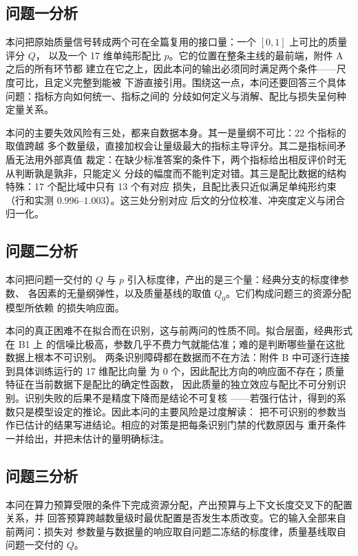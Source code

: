 \documentclass[bwprint]{gmcmthesis}
\numberwithin{equation}{section}
\numberwithin{figure}{section}
\numberwithin{table}{section}
\begin{document}

\subsection{问题一分析}

本问把原始质量信号转成两个可在全篇复用的接口量：一个 $[0,1]$ 上可比的质量评分 $Q$，
以及一个 17 维单纯形配比 $p$。它的位置在整条主线的最前端，附件 A 之后的所有环节都
建立在它之上，因此本问的输出必须同时满足两个条件——尺度可比，且定义完整到能被
下游直接引用。围绕这一点，本问还要回答三个具体问题：指标方向如何统一、指标之间的
分歧如何定义与消解、配比与损失呈何种定量关系。

本问的主要失效风险有三处，都来自数据本身。其一是量纲不可比：22 个指标的取值跨越
多个数量级，直接加权会让量级最大的指标主导评分。其二是指标间矛盾无法用外部真值
裁定：在缺少标准答案的条件下，两个指标给出相反评价时无从判断孰是孰非，只能定义
分歧的幅度而不能判定对错。其三是配比数据的结构特殊：17 个配比域中只有 13 个有对应
损失，且配比表只近似满足单纯形约束（行和实测 $0.996$--$1.003$）。这三处分别对应
后文的分位校准、冲突度定义与闭合归一化。

\subsection{问题二分析}

本问把问题一交付的 $Q$ 与 $p$ 引入标度律，产出的是三个量：经典分支的标度律参数、
各因素的无量纲弹性，以及质量基线的取值 $Q_0$。它们构成问题三的资源分配模型所依赖
的损失响应面。

本问的真正困难不在拟合而在识别，这与前两问的性质不同。拟合层面，经典形式在 B1 上
的信噪比极高，参数几乎不费力气就能估准；难的是判断哪些量在这批数据上根本不可识别。
两条识别障碍都在数据而不在方法：附件 B 中可逐行连接到具体训练运行的 17 维配比向量
为 $0$ 个，因此配比方向的响应面不存在；质量特征在当前数据下是配比的确定性函数，
因此质量的独立效应与配比不可分别识别。识别失败的后果不是精度下降而是结论不可复核
——若强行估计，得到的系数只是模型设定的推论。因此本问的主要风险是过度解读：
把不可识别的参数当作已估计的结果写进结论。相应的对策是把每条识别门禁的代数原因与
重开条件一并给出，并把未估计的量明确标注。

\subsection{问题三分析}

本问在算力预算受限的条件下完成资源分配，产出预算与上下文长度交叉下的配置关系，并
回答预算跨越数量级时最优配置是否发生本质改变。它的输入全部来自前两问：损失对
参数量与数据量的响应取自问题二冻结的标度律，质量基线取自问题一交付的 $Q$。
\end{document}
